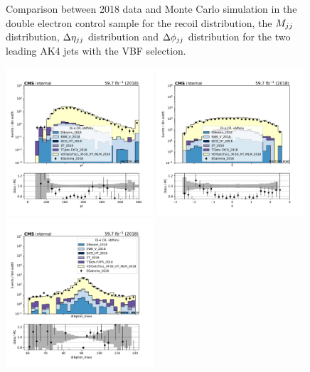 \begin{figure}[htbp]
\begin{center}
    \end{center}
    \caption{Comparison between 2018 data and Monte Carlo simulation in the double electron control sample for
        the recoil distribution, the $M_{jj}$ distribution, $\Delta \eta_{jj}$ distribution and $\Delta \phi_{jj}$ distribution 
        for the two leading AK4 jets with the VBF selection.}
    \label{fig:DE_vbfhinv_2018}
\end{figure}

\begin{figure}[htbp]
    \begin{center}
        \includegraphics[width=0.49\textwidth]{fig/datamc/cr_2e_vbf/cr_2e_vbf_electron_pt0_losf_2018.pdf}
        \includegraphics[width=0.49\textwidth]{fig/datamc/cr_2e_vbf/cr_2e_vbf_electron_eta0_losf_2018.pdf} \\
        \includegraphics[width=0.49\textwidth]{fig/datamc/cr_2e_vbf/cr_2e_vbf_dielectron_mass_losf_2018.pdf}

\end{center}
\end{figure}
